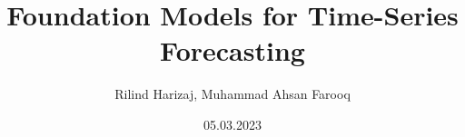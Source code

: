 \documentclass[
    language=english, %
    thesis=seminar, %
    chair=machineLearning, %
    supervisor=supervisor, %
    license=cc-by-sa, %
    multiauthor=true, %
    ]{settings/wi-thesis}
\title{Foundation Models for Time-Series Forecasting}
\author{Rilind Harizaj, Muhammad Ahsan Farooq}
\date{05.03.2023}
\begin{document}
    \maketitle


    \tableofcontents


	\begin{content}
    	
    	
        
        
        
    	

        \begin{appendix}
            
        \end{appendix}
    \end{content}

    \begin{backmatter}
        \begingroup
        \setlength{\emergencystretch}{.5em}
        \printbibliography[
            heading=bibintoc,
            title={Bibliography}
        ]
        \endgroup
        \declaration
        \consent
    \end{backmatter}

\end{document}
